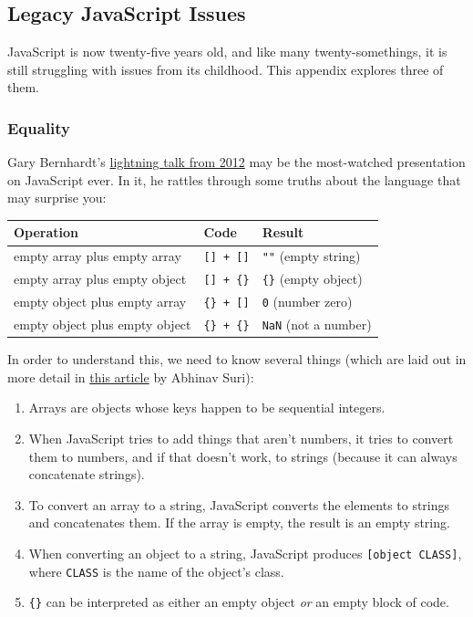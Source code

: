 \hypertarget{s:legacy}{\subsection{Legacy JavaScript
Issues}\label{s:legacy}}

JavaScript is now twenty-five years old, and like many
twenty-somethings, it is still struggling with issues from its
childhood. This appendix explores three of them.

\hypertarget{s:legacy-equality}{\subsubsection{Equality}\label{s:legacy-equality}}

Gary Bernhardt's
\href{https://www.destroyallsoftware.com/talks/wat}{lightning talk from
2012} may be the most-watched presentation on JavaScript ever. In it, he
rattles through some truths about the language that may surprise you:

\begin{longtable}[]{@{}lll@{}}
\toprule
Operation & Code & Result\tabularnewline
\midrule
\endhead
empty array plus empty array & \texttt{{[}{]}\ +\ {[}{]}} & \texttt{""}
(empty string)\tabularnewline
empty array plus empty object & \texttt{{[}{]}\ +\ \{\}} & \texttt{\{\}}
(empty object)\tabularnewline
empty object plus empty array & \texttt{\{\}\ +\ {[}{]}} & \texttt{0}
(number zero)\tabularnewline
empty object plus empty object & \texttt{\{\}\ +\ \{\}} & \texttt{NaN}
(not a number)\tabularnewline
\bottomrule
\end{longtable}

In order to understand this, we need to know several things (which are
laid out in more detail in
\href{https://medium.com/dailyjs/the-why-behind-the-wat-an-explanation-of-javascripts-weird-type-system-83b92879a8db}{this
article} by Abhinav Suri):

\begin{enumerate}
\tightlist
\item
  Arrays are objects whose keys happen to be sequential integers.
\item
  When JavaScript tries to add things that aren't numbers, it tries to
  convert them to numbers, and if that doesn't work, to strings (because
  it can always concatenate strings).
\item
  To convert an array to a string, JavaScript converts the elements to
  strings and concatenates them. If the array is empty, the result is an
  empty string.
\item
  When converting an object to a string, JavaScript produces
  \texttt{{[}object\ CLASS{]}}, where \texttt{CLASS} is the name of the
  object's class.
\item
  \texttt{\{\}} can be interpreted as either an empty object \emph{or}
  an empty block of code.
\end{enumerate}

